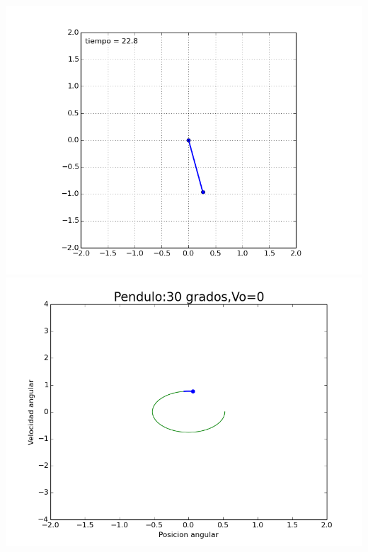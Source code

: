 \documentclass[12pt]{article}
\begin{document}
\begin{center}
\includegraphics[scale=0.5]{30.png}\\
\includegraphics[scale=0.5]{figure_30.png}
\end{center}
\end{document}
